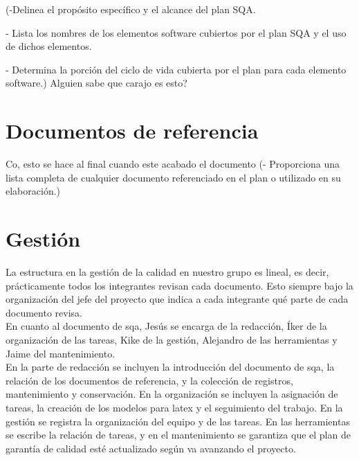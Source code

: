 \documentclass[spanish,a4paper,11pt, twoside]{report}	%
\begin{document}
	(-Delinea el propósito específico y el alcance del plan	SQA.

	- Lista los nombres de los elementos software cubiertos por el plan SQA y el uso de dichos elementos.
		
	- Determina la porción del ciclo de vida cubierta por el plan para cada elemento software.) Alguien sabe que carajo es esto?

\newpage
\mbox{}
\thispagestyle{empty}						%
\newpage

\chapter{ Documentos de referencia}
	Co, esto se hace al final cuando este acabado el documento
	(- Proporciona una lista completa de cualquier documento referenciado en el plan o utilizado en su elaboración.)

\newpage
\mbox{}
\thispagestyle{empty}						%
\newpage

\chapter{ Gestión}%
	La estructura en la gestión de la calidad en nuestro grupo es lineal, es decir, prácticamente todos los integrantes revisan cada documento. Esto siempre bajo la organización del 
	jefe del proyecto que indica a cada integrante qué parte de cada documento revisa.\\

	 En cuanto al documento de sqa, Jesús se encarga de la redacción, Íker de la organización de las tareas, Kike de la 
	gestión, Alejandro de las herramientas y Jaime del mantenimiento.\\

	En la parte de redacción se incluyen  la introducción del documento de sqa, la relación de los documentos de referencia, y la colección de registros, mantenimiento y conservación. En la organización se incluyen  la asignación de tareas, 
	la creación de los modelos para latex y el seguimiento del trabajo. En la gestión se registra la organización del equipo y de las tareas. En las herramientas se escribe la relación de tareas, y en el mantenimiento se garantiza
	que el plan de garantía de calidad esté actualizado según va avanzando el proyecto.\\

	

\newpage
\mbox{}
\thispagestyle{empty}						%
\newpage
\end{document}
